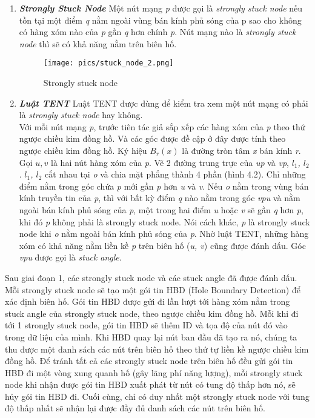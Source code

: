 \documentclass[12pt]{report}
\begin{document}
\begin{enumerate}
\item \textit{\textbf{Strongly Stuck Node}}
Một nút mạng \textit{p} được gọi là \textit{strongly stuck node} nếu tồn tại một điểm \textit{q} nằm ngoài vùng bán kính phủ sóng của p sao cho không có hàng xóm nào của \textit{p} gần \textit{q} hơn chính \textit{p}. Nút mạng nào là \textit{strongly stuck node} thì sẽ có khả năng nằm trên biên hố.
\begin{figure}[H]
\centering
\texttt{[image: pics/stuck\_node\_2.png]}
\caption{Strongly stuck node}
\end{figure}

\item \textit{\textbf{Luật TENT}} Luật TENT được dùng để kiểm tra xem một nút mạng có phải là \textit{strongly stuck node} hay không.\\
Với mỗi nút mạng \textit{p}, trước tiên tác giả sắp xếp các hàng xóm của \textit{p} theo thứ ngược chiều kim đồng hồ. Và các góc được đề cập ở đây được tính theo ngược chiều kim đồng hồ. Ký hiệu $B_{r}(x)$ là đường tròn tâm \textit{x} bán kính \textit{r}. Gọi $u, v$ là hai nút hàng xóm của \textit{p}. Vẽ 2 đường trung trực của \textit{up} và \textit{vp}, \textit{$l_{1}$, $l_{2}$}. \textit{$l_{1}$, $l_{2}$} cắt nhau tại \textit{o} và chia mặt phẳng thành 4 phần (hình 4.2). Chỉ những điểm nằm trong góc chứa \textit{p} mới gần \textit{p} hơn \textit{u} và \textit{v}. Nếu \textit{o} nằm trong vùng bán kính truyền tin của \textit{p}, thì với bất kỳ điểm \textit{q} nào nằm trong góc \textit{vpu} và nằm ngoài bán kính phủ sóng của \textit{p}, một trong hai điểm \textit{u} hoặc \textit{v} sẽ gần \textit{q} hơn \textit{p}, khi đó \textit{p} không phải là strongly stuck node. Nói cách khác, \textit{p} là strongly stuck node khi \textit{o} nằm ngoài bán kính phủ sóng của \textit{p}. Nhờ luật TENT, những hàng xóm có khả năng nằm liền kề \textit{p} trên biên hố (\textit{u, v}) cũng được đánh dấu. Góc \textit{vpu} được gọi là \textit{stuck angle}.
\end{enumerate}
Sau giai đoạn 1, các strongly stuck node và các stuck angle đã được đánh dấu. Mỗi strongly stuck node sẽ tạo một gói tin HBD (Hole Boundary Detection) để xác định biên hố. Gói tin HBD được gửi đi lần lượt tới hàng xóm nằm trong stuck angle của strongly stuck node, theo ngược chiều kim đồng hồ. Mỗi khi đi tới 1 strongly stuck node, gói tin HBD sẽ thêm ID và tọa độ của nút đó vào trong dữ liệu của mình. Khi HBD quay lại nút ban đầu đã tạo ra nó, chúng ta thu được một danh sách các nút trên biên hố theo thứ tự liền kề ngược chiều kim đồng hồ. Để tránh tất cả các strongly stuck node trên biên hố đều gửi gói tin HBD đi một vòng xung quanh hố (gây lãng phí năng lượng), mỗi strongly stuck node khi nhận được gói tin HBD xuất phát từ nút có tung độ thấp hơn nó, sẽ hủy gói tin HBD đi. Cuối cùng, chỉ có duy nhất một strongly stuck node với tung độ thấp nhất sẽ nhận lại được đầy đủ danh sách các nút trên biên hố.
\end{document}
